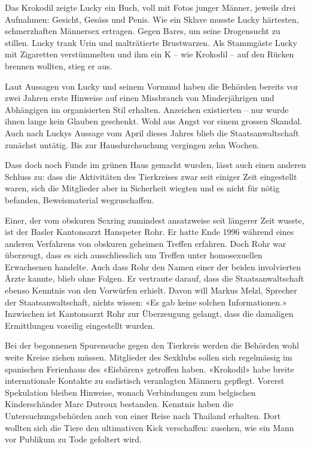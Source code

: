 Das Krokodil zeigte Lucky ein Buch, voll mit Fotos junger Männer,
jeweils drei Aufnahmen: Gesicht, Gesäss und Penis. Wie ein Sklave musste
Lucky härtesten, schmerzhaften Männersex ertragen. Gegen Bares, um seine
Drogensucht zu stillen. Lucky trank Urin und malträtierte Brustwarzen.
Als Stammgäste Lucky mit Zigaretten verstümmelten und ihm ein K -- wie
Krokodil -- auf den Rücken brennen wollten, stieg er aus.

Laut Aussagen von Lucky und seinem Vormund haben die Behörden bereits
vor zwei Jahren erste Hinweise auf einen Missbrauch von Minderjährigen
und Abhängigen im organisierten Stil erhalten. Anzeichen existierten --
nur wurde ihnen lange kein Glauben geschenkt. Wohl aus Angst vor einem
grossen Skandal. Auch nach Luckys Aussage vom April dieses Jahres blieb
die Staatsanwaltschaft zunächst untätig. Bis zur Hausdurchsuchung
vergingen zehn Wochen.

Dass doch noch Funde im grünen Haus gemacht wurden, lässt auch einen
anderen Schluss zu: dass die Aktivitäten des Tierkreises zwar seit
einiger Zeit eingestellt waren, sich die Mitglieder aber in Sicherheit
wiegten und es nicht für nötig befanden, Beweismaterial wegzuschaffen.

Einer, der vom obskuren Sexring zumindest ansatzweise seit längerer Zeit
wusste, ist der Basler Kantonsarzt Hanspeter Rohr. Er hatte Ende 1996
während eines anderen Verfahrens von obskuren geheimen Treffen erfahren.
Doch Rohr war überzeugt, dass es sich ausschliesslich um Treffen unter
homosexuellen Erwachsenen handelte. Auch dass Rohr den Namen einer der
beiden involvierten Ärzte kannte, blieb ohne Folgen. Er vertraute
darauf, dass die Staatsanwaltschaft ebenso Kenntnis von den Vorwürfen
erhielt. Davon will Markus Melzl, Sprecher der Staatsanwaltschaft,
nichts wissen: «Es gab keine solchen Informationen.» Inzwischen ist
Kantonsarzt Rohr zur Überzeugung gelangt, dass die damaligen
Ermittlungen voreilig eingestellt wurden.

Bei der begonnenen Spurensuche gegen den Tierkreis werden die Behörden
wohl weite Kreise ziehen müssen. Mitglieder des Sexklubs sollen sich
regelmässig im spanischen Ferienhaus des «Eisbären» getroffen haben.
«Krokodil» habe breite internationale Kontakte zu sadistisch veranlagten
Männern gepflegt. Vorerst Spekulation bleiben Hinweise, wonach
Verbindungen zum belgischen Kinderschänder Marc Dutroux bestanden.
Kenntnis haben die Untersuchungsbehörden auch von einer Reise nach
Thailand erhalten. Dort wollten sich die Tiere den ultimativen Kick
verschaffen: zusehen, wie ein Mann vor Publikum zu Tode gefoltert wird.

